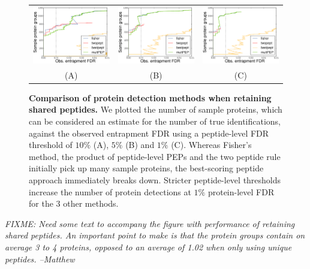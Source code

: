 \documentclass{article}
\begin{document}
\begin{figure}
\begin{center}
\begin{tabular}{ccc} 
\includegraphics[width=0.3\linewidth]
  {./img/shared-pept-performance-fdr10} &
\includegraphics[width=0.3\linewidth]
  {./img/shared-pept-performance-fdr5} &
\includegraphics[width=0.3\linewidth]
  {./img/shared-pept-performance-fdr1}\\
(A) & (B) & (C)
\end{tabular}
\caption{\label{fig:shared-performance}\textbf{Comparison of protein
    detection methods when retaining shared peptides.} We plotted the
  number of sample proteins, which can be considered an estimate for
  the number of true identifications, against the observed entrapment
  FDR using a peptide-level FDR threshold of $10\%$ (A), $5\%$ (B) and
  $1\%$ (C). Whereas Fisher's method, the product of peptide-level
  PEPs and the two peptide rule initially pick up many sample
  proteins, the best-scoring peptide approach immediately breaks
  down. Stricter peptide-level thresholds increase the number of
  protein detections at $1\%$ protein-level FDR for the $3$ other
  methods.}
\end{center}
\end{figure}

{\em FIXME: Need some text to accompany the figure with performance of
  retaining shared peptides. An important point to make is that the
  protein groups contain on average 3 to 4 proteins, opposed to an
  average of 1.02 when only using unique peptides. --Matthew}
\end{document}
